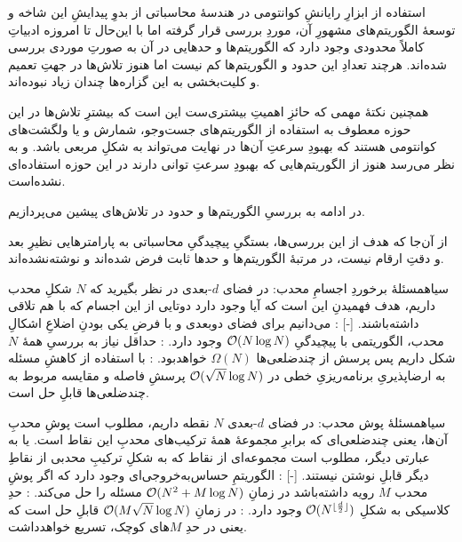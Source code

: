 

استفاده از ابزارِ رایانشِ کوانتومی در هندسهٔ محاسباتی از بدوِ پیدایشِ این شاخه و توسعهٔ الگوریتم‌های مشهورِ آن، موردِ بررسی قرار گرفته  اما با این‌حال تا امروزه ادبیاتِ کاملاً محدودی وجود دارد که الگوریتم‌ها و حدهایی در آن به صورتِ‌ موردی بررسی شده‌اند. هرچند تعدادِ این حدود و الگوریتم‌ها کم نیست اما هنوز تلاش‌ها در جهتِ تعمیم و کلیت‌بخشی به این گزاره‌ها چندان زیاد نبوده‌اند.

همچنین نکتهٔ مهمی که حائزِ اهمیتِ بیشتری‌ست این است که بیشترِ تلاش‌ها در این حوزه معطوف به استفاده از الگوریتم‌های جست‌وجو، شمارش و یا ولگشت‌های کوانتومی هستند که بهبودِ سرعتِ آن‌ها در نهایت می‌تواند به شکلِ مربعی باشد. و به نظر می‌رسد هنوز از الگوریتم‌هایی که بهبودِ سرعتِ توانی
 دارند در این حوزه استفاده‌ای نشده‌است. 

در ادامه به بررسیِ الگوریتم‌ها و حدود در تلاش‌های پیشین می‌پردازیم.

از آن‌جا که هدف از این بررسی‌ها، بستگیِ پیچیدگیِ محاسباتی به پارامترهایی نظیرِ بعد و دقتِ ارقام نیست، در مرتبهٔ الگوریتم‌ها و حدها ثابت فرض شده‌اند و نوشته‌نشده‌اند.

‌سیاه{مسئلهٔ برخوردِ اجسامِ محدب}: در فضای $d$-بعدی در نظر بگیرید که $N$ شکلِ محدب داریم، هدف فهمیدنِ این است که آیا وجود دارد دوتایی از این اجسام که با هم تلاقی داشته‌باشند. 
[-]
    : می‌دانیم برای فضای دوبعدی و با فرضِ یکی بودنِ اضلاعِ اشکالِ محدب، الگوریتمی با پیچیدگیِ
    $\mathcal{O}(N \log N)$
    وجود دارد.
    : حداقل نیاز به بررسیِ همهٔ $N$ شکل داریم پس پرسش از چندضلعی‌ها 
    $\Omega(N)$
    خواهدبود.
    : با استفاده از کاهشِ مسئله به ارضاپذیریِ برنامه‌ریزیِ خطی در 
    $\mathcal{O}(\sqrt{N}\log N)$
    پرسشِ فاصله و مقایسه مربوط به چندضلعی‌ها قابلِ حل است.

‌سیاه{مسئلهٔ پوش محدب}: در فضای $d$-بعدی $N$ نقطه داریم، مطلوب است پوشِ محدبِ آن‌ها، یعنی چندضلعی‌ای که برابرِ مجموعهٔ همهٔ ترکیب‌های محدبِ این نقاط است. یا به عبارتی دیگر، مطلوب است مجموعه‌ای از نقاط که به شکلِ ترکیبِ محدبی از نقاطِ دیگر قابلِ نوشتن نیستند. 
[-]
    : الگوریتمِ حساس‌به‌خروجی‌ای وجود دارد که اگر پوشِ محدب $M$ رویه داشته‌باشد در زمانِ
    $\mathcal{O}(N^2 + M\log N)$
    مسئله را حل می‌کند.
    : حدِ کلاسیکی به شکلِ 
    $\mathcal{O}(N^{\lfloor \frac{d}{2}\rfloor})$
    وجود دارد.
    : در زمانِ
    $\mathcal{O}(M \sqrt{N} \log N)$
    قابلِ حل است که یعنی در حدِ $M$های کوچک، تسریع خواهدداشت.

